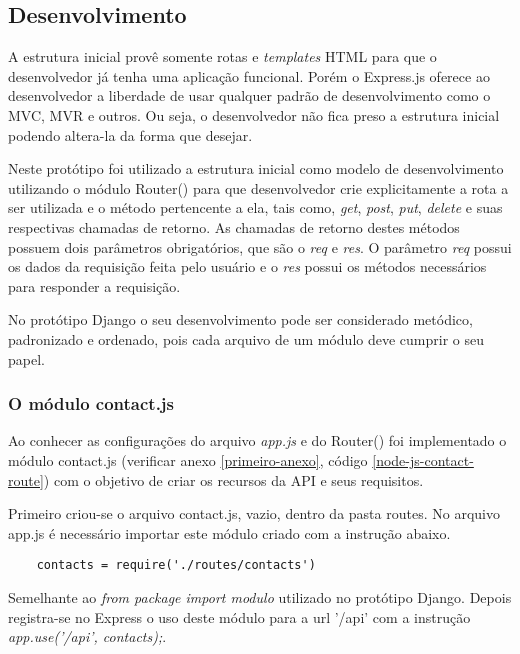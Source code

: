 \subsection{Desenvolvimento}
  
  A estrutura inicial provê somente rotas e \textit{templates} HTML para que o desenvolvedor já tenha uma aplicação funcional.
  Porém o Express.js oferece ao desenvolvedor a liberdade de usar qualquer padrão de desenvolvimento como o MVC, MVR e 
  outros. Ou seja, o desenvolvedor não fica preso a estrutura inicial podendo altera-la da forma que desejar. 
  
  Neste protótipo foi utilizado a estrutura inicial como modelo de desenvolvimento utilizando o módulo Router() para que desenvolvedor
  crie explicitamente a rota a ser utilizada e o método pertencente a ela, tais como, \textit{get}, \textit{post}, \textit{put}, \textit{delete} e suas respectivas
  chamadas de retorno. As chamadas de retorno destes métodos possuem dois parâmetros obrigatórios, que são o \textit{req} e \textit{res}. O parâmetro
  \textit{req} possui os dados da requisição feita pelo usuário e o \textit{res} possui os métodos necessários para responder a requisição.
  
  No protótipo Django o seu desenvolvimento pode ser considerado metódico, padronizado e ordenado, pois cada arquivo de um módulo
  deve cumprir o seu papel.

\subsubsection{O módulo contact.js }

  Ao conhecer as configurações do arquivo \textit{app.js} e do Router() foi implementado o módulo contact.js (verificar anexo \ref{primeiro-anexo}, código \ref{node-js-contact-route}) com o objetivo
  de criar os recursos da API e seus requisitos.
  
  Primeiro criou-se o arquivo contact.js, vazio, dentro da pasta routes. No arquivo app.js é necessário importar este módulo criado com a
  instrução abaixo.
  
  \begin{verbatim}
    contacts = require('./routes/contacts')
  \end{verbatim}
  
  Semelhante ao \textit{from package import modulo} utilizado no protótipo Django. Depois 
  registra-se no Express o uso deste módulo para a url '/api' com a instrução \textit{app.use('/api', contacts);}.
  
